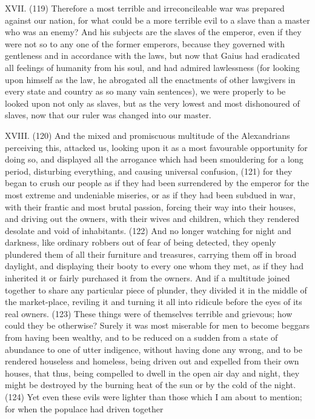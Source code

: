 XVII. (119) Therefore a most terrible and irreconcileable war was prepared against our nation, for
what could be a more terrible evil to a slave than a master who was an enemy? And his subjects
are the slaves of the emperor, even if they were not so to any one of the former emperors,
because they governed with gentleness and in accordance with the laws, but now that Gaius had
eradicated all feelings of humanity from his soul, and had admired lawlessness (for looking upon
himself as the law, he abrogated all the enactments of other lawgivers in every state and country
as so many vain sentences), we were properly to be looked upon not only as slaves, but as the
very lowest and most dishonoured of slaves, now that our ruler was changed into our master.

XVIII. (120) And the mixed and promiscuous multitude of the Alexandrians perceiving this, attacked
us, looking upon it as a most favourable opportunity for doing so, and displayed all the arrogance
which had been smouldering for a long period, disturbing everything, and causing universal
confusion, (121) for they began to crush our people as if they had been surrendered by the
emperor for the most extreme and undeniable miseries, or as if they had been subdued in war, with
their frantic and most brutal passion, forcing their way into their houses, and driving out the owners,
with their wives and children, which they rendered desolate and void of inhabitants. (122) And no
longer watching for night and darkness, like ordinary robbers out of fear of being detected, they
openly plundered them of all their furniture and treasures, carrying them off in broad daylight, and
displaying their booty to every one whom they met, as if they had inherited it or fairly purchased it
from the owners. And if a multitude joined together to share any particular piece of plunder, they
divided it in the middle of the market-place, reviling it and turning it all into ridicule before the eyes
of its real owners. (123) These things were of themselves terrible and grievous; how could they be
otherwise? Surely it was most miserable for men to become beggars from having been wealthy,
and to be reduced on a sudden from a state of abundance to one of utter indigence, without having
done any wrong, and to be rendered houseless and homeless, being driven out and expelled from
their own houses, that thus, being compelled to dwell in the open air day and night, they might be
destroyed by the burning heat of the sun or by the cold of the night. (124) Yet even these evils
were lighter than those which I am about to mention; for when the populace had driven together
